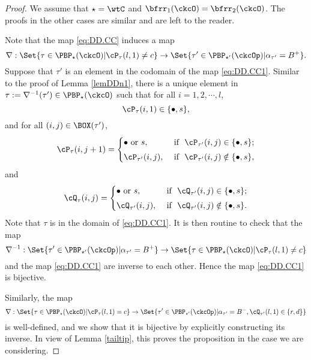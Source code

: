 \documentclass[ssunip]{subfiles}
\begin{document}
\begin{proof}
We assume that $\star = \wtC$ and $\bfrr_1(\ckcO)=\bfrr_2(\ckcO)$. The proofs in the other  cases are similar and are left to the reader. 

Note that the map \eqref{eq:DD.CC} induces a map
\begin{equation}\label{eq:DD.CC1}
\nabla: \Set{\tau\in \PBP_{\star}(\ckcO)| \cP_\tau(l,1)\neq c}\rightarrow \Set{\tau'\in \PBP_{\star'}(\ckcOp)|  \alpha_{\tau'}=B^+}. 
\end{equation}
Suppose that $\tau'$ is an element  in the codomain of the map \eqref{eq:DD.CC1}. Similar to the proof of Lemma \ref{lemDDn1}, there is a unique element in $\tau:=\nabla^{-1}(\tau')\in \PBP_{\star}(\ckcO)$ such that
for all $i=1,2, \cdots,l$, 
\[
  \cP_{\tau}(i,1)\in \{\bullet, s\},
\]
and
for all $(i,j)\in \BOX(\tau')$, 
\begin{equation}
     \cP_\tau(i,j+1)=\begin{cases}   
    \bullet \textrm{ or } s,&\textrm{ if  $\ \cP_{\tau'}(i,j)\in \{\bullet, s\}$;} \smallskip \\
  \cP_{\tau'}(i,j),& \textrm{ if $\ \cP_{\tau'}(i,j)\notin \{\bullet, s\}$},\end{cases}
   \end{equation}
 and
   \begin{equation}
     \cQ_\tau(i,j)=\begin{cases}   
    \bullet \textrm{ or } s,&\textrm{ if  $\ \cQ_{\tau'}(i,j)\in \{\bullet, s\}$;} \smallskip \\
  \cQ_{\tau'}(i,j), & \textrm{ if $\ \cQ_{\tau'}(i,j)\notin \{\bullet, s\}$}.  \end{cases}
   \end{equation}
Note that $\tau$ is in the domain of \eqref{eq:DD.CC1}. It is then routine to check that the map
\[
  \nabla^{-1}: \Set{\tau'\in \PBP_{\star'}(\ckcOp)|  \alpha_{\tau'}=B^+} \rightarrow  \Set{\tau\in \PBP_{\star}(\ckcO)| \cP_\tau(l,1)\neq c}
\]
and the map \eqref{eq:DD.CC1} are inverse to each other. Hence the map \eqref{eq:DD.CC1} is bijective. 


Similarly, the map
\[
\nabla: \Set{\tau\in \PBP_{\star}(\ckcO)| \cP_\tau(l,1)= c}\rightarrow \Set{\tau'\in \PBP_{\star'}(\ckcOp)| \alpha_{\tau'}=B^-, \cQ_{\tau'}(l,1)\in\{r,d\}} 
\]
is well-defined, and we show that it is bijective by explicitly  constructing its inverse. In view of Lemma \ref{tailtip}, this proves the proposition in the case we are considering. 


\end{proof}
\end{document}
